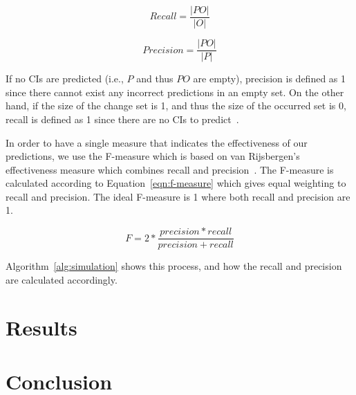 \documentclass{article}
\begin{document}
\begin{equation}
\label{eqn:recall}
Recall = \frac{|PO|}{|O|}
\end{equation}

\begin{equation}
\label{eqn:precision}
Precision = \frac{|PO|}{|P|}
\end{equation}

If no CIs are predicted (i.e., $P$ and thus $PO$ are empty), precision is defined as 1 since there cannot exist any incorrect predictions in an empty set. On
the other hand, if the size of the change set is 1, and thus the size of the occurred set is 0, recall is defined as 1 since there are no CIs to
predict~\cite{hassan2004predicting}.  

In order to have a single measure that indicates the effectiveness of our predictions, we use the F-measure which is based on van Rijsbergen's effectiveness
measure which combines recall and precision~\cite{van79}. The F-measure is calculated according to Equation~\ref{eqn:f-measure} which gives equal weighting to
recall and precision. The ideal F-measure is 1 where both recall and precision are 1.

\begin{equation}
F = 2 * \frac{precision * recall}{precision +recall}
\label{eqn:f-measure}
\end{equation}

Algorithm~\ref{alg:simulation} shows this process, and how the recall and precision are calculated accordingly.


\section{Results}
\label{sec:results}

\section{Conclusion}
\label{concl}




\end{document}
